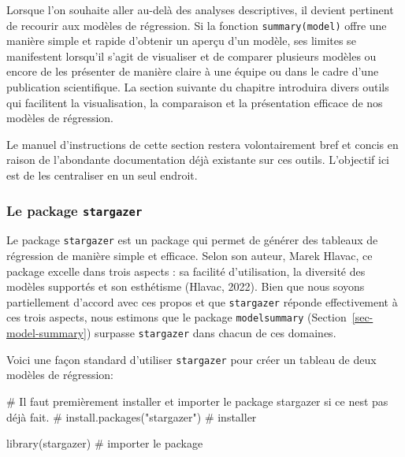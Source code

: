 \documentclass[
  letterpaper,
  DIV=11,
  numbers=noendperiod]{scrreprt}
\newenvironment{Shaded}{\begin{snugshade}}{\end{snugshade}}
\newcommand{\CommentTok}[1]{\textcolor[rgb]{0.37,0.37,0.37}{#1}}
\newcommand{\FunctionTok}[1]{\textcolor[rgb]{0.28,0.35,0.67}{#1}}
\newcommand{\NormalTok}[1]{\textcolor[rgb]{0.00,0.23,0.31}{#1}}
\begin{document}
Lorsque l'on souhaite aller au-delà des analyses descriptives, il
devient pertinent de recourir aux modèles de régression. Si la fonction
\texttt{summary(model)} offre une manière simple et rapide d'obtenir un
aperçu d'un modèle, ses limites se manifestent lorsqu'il s'agit de
visualiser et de comparer plusieurs modèles ou encore de les présenter
de manière claire à une équipe ou dans le cadre d'une publication
scientifique. La section suivante du chapitre introduira divers outils
qui facilitent la visualisation, la comparaison et la présentation
efficace de nos modèles de régression.

\begin{tcolorbox}[enhanced jigsaw, breakable, rightrule=.15mm, colbacktitle=quarto-callout-note-color!10!white, colback=white, leftrule=.75mm, colframe=quarto-callout-note-color-frame, arc=.35mm, toptitle=1mm, bottomtitle=1mm, toprule=.15mm, opacitybacktitle=0.6, bottomrule=.15mm, opacityback=0, title=\textcolor{quarto-callout-note-color}{\faInfo}\hspace{0.5em}{Note}, left=2mm, titlerule=0mm, coltitle=black]

Le manuel d'instructions de cette section restera volontairement bref et
concis en raison de l'abondante documentation déjà existante sur ces
outils. L'objectif ici est de les centraliser en un seul endroit.

\end{tcolorbox}

\subsubsection{\texorpdfstring{Le package
\texttt{stargazer}}{Le package stargazer}}\label{le-package-stargazer}

Le package \texttt{stargazer} est un package qui permet de générer des
tableaux de régression de manière simple et efficace. Selon son auteur,
Marek Hlavac, ce package excelle dans trois aspects : sa facilité
d'utilisation, la diversité des modèles supportés et son esthétisme
(Hlavac, 2022). Bien que nous soyons partiellement d'accord avec ces
propos et que \texttt{stargazer} réponde effectivement à ces trois
aspects, nous estimons que le package \texttt{modelsummary}
(Section~\ref{sec-model-summary}) surpasse \texttt{stargazer} dans
chacun de ces domaines.

Voici une façon standard d'utiliser \texttt{stargazer} pour créer un
tableau de deux modèles de régression:

\begin{Shaded}
\begin{Highlighting}[]
\CommentTok{\# Il faut premièrement installer et importer le package stargazer si ce n\textquotesingle{}est pas déjà fait.}
\CommentTok{\# install.packages("stargazer") \# installer}

\FunctionTok{library}\NormalTok{(stargazer) }\CommentTok{\# importer le package}
\end{Highlighting}
\end{Shaded}
\end{document}
